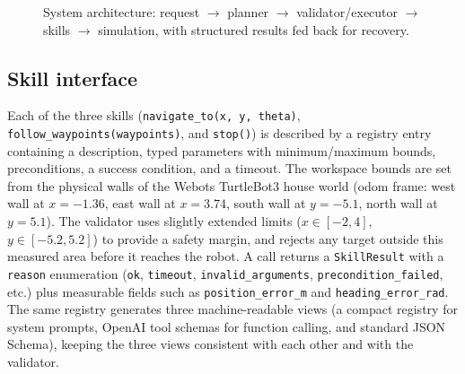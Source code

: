 \documentclass[conference]{IEEEtran}
\begin{document}
\begin{figure}[t]
\centering
{}
\caption{System architecture: request $\rightarrow$ planner $\rightarrow$
validator/executor $\rightarrow$ skills $\rightarrow$ simulation, with
structured results fed back for recovery.}
\label{fig:arch}
\end{figure}

\subsection{Skill interface}
Each of the three skills (\texttt{navigate\_to(x, y, theta)},
\texttt{follow\_waypoints(waypoints)}, and \texttt{stop()}) is described by
a registry entry containing a description, typed parameters with
minimum/maximum bounds, preconditions, a success condition, and a timeout.
The workspace bounds are set from the physical walls of the Webots
TurtleBot3 house world (odom frame: west wall at $x=-1.36$, east wall at
$x=3.74$, south wall at $y=-5.1$, north wall at $y=5.1$). The validator uses
slightly extended limits ($x \in [-2,4]$, $y \in [-5.2,5.2]$) to provide a
safety margin, and rejects any target outside this measured area before it
reaches the robot. A call returns a \texttt{SkillResult} with a
\texttt{reason} enumeration (\texttt{ok}, \texttt{timeout},
\texttt{invalid\_arguments}, \texttt{precondition\_failed}, etc.) plus
measurable fields such as \texttt{position\_error\_m} and
\texttt{heading\_error\_rad}. The same registry generates three
machine-readable views (a compact registry for system prompts, OpenAI tool
schemas for function calling, and standard JSON Schema), keeping the three
views consistent with each other and with the validator.
\end{document}
